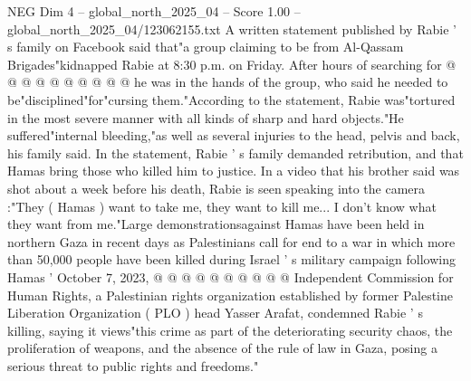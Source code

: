\begin{textsample}{NEG Dim 4 – global\_north\_2025\_04 – Score 1.00 – global\_north\_2025\_04/123062155.txt}
A written statement published by Rabie ' s family on Facebook said that"a group claiming to be from Al-Qassam Brigades"kidnapped Rabie at 8:30 p.m. on Friday.
After hours of searching for @ @ @ @ @ @ @ @ @ @ he was in the hands of the group, who said he needed to be"disciplined"for"cursing them."According to the statement, Rabie was"tortured in the most severe manner with all kinds of sharp and hard objects."He suffered"internal bleeding,"as well as several injuries to the head, pelvis and back, his family said.
In the statement, Rabie ' s family demanded retribution, and that Hamas bring those who killed him to justice.
In a video that his brother said was shot about a week before his death, Rabie is seen speaking into the camera :"They ( Hamas ) want to take me, they want to kill me...
I don't know what they want from me."Large demonstrationsagainst Hamas have been held in northern Gaza in recent days as Palestinians call for end to a war in which more than 50,000 people have been killed during Israel ' s military campaign following Hamas ' October 7, 2023, @ @ @ @ @ @ @ @ @ @ Independent Commission for Human Rights, a Palestinian rights organization established by former Palestine Liberation Organization ( PLO ) head Yasser Arafat, condemned Rabie ' s killing, saying it views"this crime as part of the deteriorating security chaos, the proliferation of weapons, and the absence of the rule of law in Gaza, posing a serious threat to public rights and freedoms."

\end{textsample}
